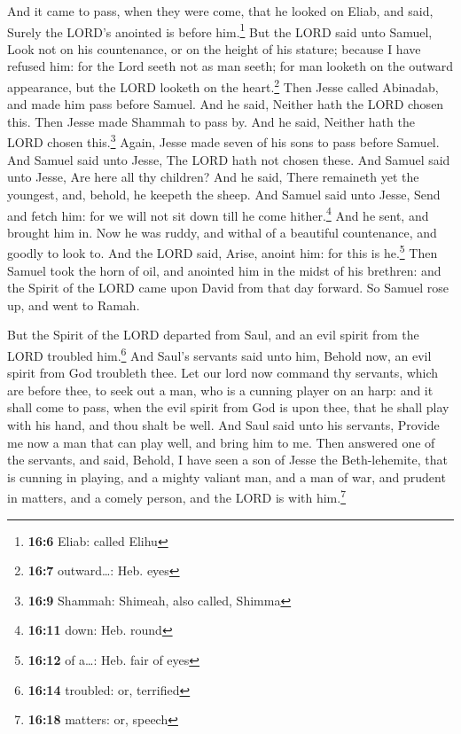  And it came to pass, when they were come, that he looked
on Eliab, and said, Surely the LORD's anointed is before him.\footnote{\textbf{16:6}
  Eliab: called Elihu}  But the LORD said unto Samuel,
Look not on his countenance, or on the height of his stature; because I
have refused him: for the Lord seeth not as man seeth; for man looketh
on the outward appearance, but the LORD looketh on the heart.\footnote{\textbf{16:7}
  outward\ldots: Heb. eyes}  Then Jesse called Abinadab,
and made him pass before Samuel. And he said, Neither hath the LORD
chosen this.  Then Jesse made Shammah to pass by. And he
said, Neither hath the LORD chosen this.\footnote{\textbf{16:9} Shammah:
  Shimeah, also called, Shimma}  Again, Jesse made seven
of his sons to pass before Samuel. And Samuel said unto Jesse, The LORD
hath not chosen these.  And Samuel said unto Jesse, Are
here all thy children? And he said, There remaineth yet the youngest,
and, behold, he keepeth the sheep. And Samuel said unto Jesse, Send and
fetch him: for we will not sit down till he come hither.\footnote{\textbf{16:11}
  down: Heb. round}  And he sent, and brought him in. Now
he was ruddy, and withal of a beautiful countenance, and goodly to look
to. And the LORD said, Arise, anoint him: for this is he.\footnote{\textbf{16:12}
  of a\ldots: Heb. fair of eyes}  Then Samuel took the
horn of oil, and anointed him in the midst of his brethren: and the
Spirit of the LORD came upon David from that day forward. So Samuel rose
up, and went to Ramah.

 But the Spirit of the LORD departed from Saul, and an
evil spirit from the LORD troubled him.\footnote{\textbf{16:14}
  troubled: or, terrified}  And Saul's servants said unto
him, Behold now, an evil spirit from God troubleth thee. 
Let our lord now command thy servants, which are before thee, to seek
out a man, who is a cunning player on an harp: and it shall come to
pass, when the evil spirit from God is upon thee, that he shall play
with his hand, and thou shalt be well.  And Saul said
unto his servants, Provide me now a man that can play well, and bring
him to me.  Then answered one of the servants, and said,
Behold, I have seen a son of Jesse the Beth-lehemite, that is cunning in
playing, and a mighty valiant man, and a man of war, and prudent in
matters, and a comely person, and the LORD is with him.\footnote{\textbf{16:18}
  matters: or, speech}

